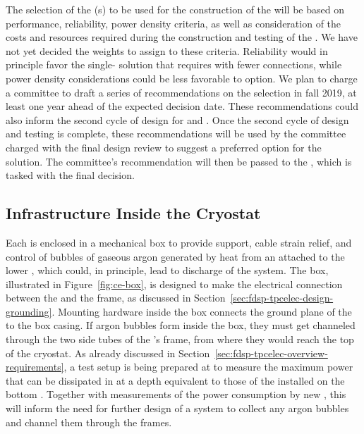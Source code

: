 The selection of the (s) to be used for the
construction of the   will be
based on performance, reliability, power density
criteria, as well as consideration of the costs and
resources required during the construction and testing
of the . We have not yet decided the weights
to assign to these criteria. Reliability would in principle favor
the single- solution that requires 
 with fewer connections, while power 
density considerations could be less favorable to  option.
We plan to charge a committee to draft a series of recommendations 
on the  selection in fall 2019, at least one year
ahead of the expected decision date. These recommendations could 
also inform the second cycle of design for
 and . Once the second cycle of design
and testing is complete, these recommendations will be used by the
committee charged with the final design review to suggest a
preferred option for the  solution.
The committee's recommendation 
will then be passed to the  , 
which is tasked with the final  decision.

\subsection{Infrastructure Inside the Cryostat}
\label{sec:fdsp-tpcelec-design-infrastructure}

Each  is enclosed in a mechanical  box 
to provide support, cable strain relief, and control of bubbles of gaseous
argon generated by heat from an  attached to the lower ,
which could, in principle, lead to discharge of the  system. The
 box, illustrated in Figure~\ref{fig:ce-box}, is designed to make the 
electrical connection between the  and the  
frame, as discussed %
in Section~\ref{sec:fdsp-tpcelec-design-grounding}.
Mounting hardware inside the  box connects the ground plane 
of the  to the box casing. If argon bubbles %
form inside
the  box, they must get %
channeled through the two side tubes
of the 's frame, from where they would reach the top of the cryostat.
As already discussed in Section~\ref{sec:fdsp-tpcelec-overview-requirements},
a test setup is being prepared at  to measure the
maximum power that can be dissipated in  at a
depth equivalent to those of the  installed on
the bottom . Together with measurements of the
power consumption by new , this will inform
the need for further design of a system to collect any
argon bubbles and channel them through the  frames.

